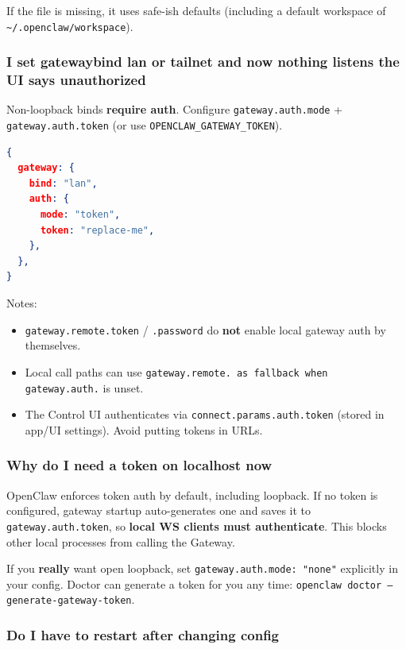 If the file is missing, it uses safe-ish defaults (including a default workspace of \texttt{\textasciitilde{}/.openclaw/workspace}).

\subsubsection{I set gatewaybind lan or tailnet and now nothing listens the UI says unauthorized}


Non-loopback binds \textbf{require auth}. Configure \texttt{gateway.auth.mode} + \texttt{gateway.auth.token} (or use \texttt{OPENCLAW\_GATEWAY\_TOKEN}).

\begin{lstlisting}[language=json]
{
  gateway: {
    bind: "lan",
    auth: {
      mode: "token",
      token: "replace-me",
    },
  },
}
\end{lstlisting}


Notes:

\begin{itemize}
  \item \texttt{gateway.remote.token} / \texttt{.password} do \textbf{not} enable local gateway auth by themselves.
  \item Local call paths can use \texttt{gateway.remote.\textit{} as fallback when \texttt{gateway.auth.}} is unset.
  \item The Control UI authenticates via \texttt{connect.params.auth.token} (stored in app/UI settings). Avoid putting tokens in URLs.
\end{itemize}


\subsubsection{Why do I need a token on localhost now}


OpenClaw enforces token auth by default, including loopback. If no token is configured, gateway startup auto-generates one and saves it to \texttt{gateway.auth.token}, so \textbf{local WS clients must authenticate}. This blocks other local processes from calling the Gateway.

If you \textbf{really} want open loopback, set \texttt{gateway.auth.mode: "none"} explicitly in your config. Doctor can generate a token for you any time: \texttt{openclaw doctor --generate-gateway-token}.

\subsubsection{Do I have to restart after changing config}


